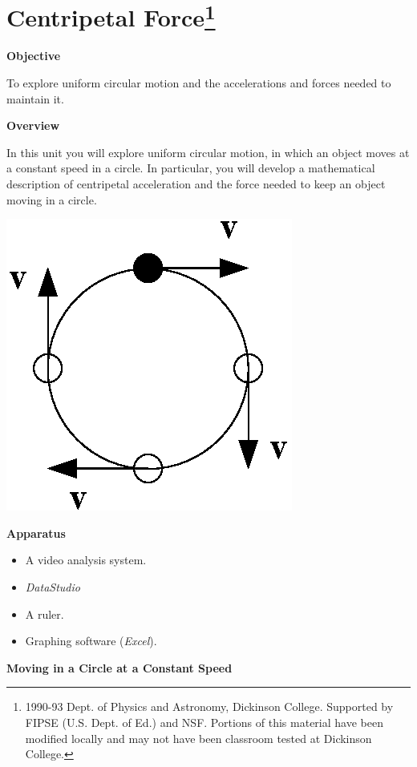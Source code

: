 \section{Centripetal Force\footnote{
1990-93 Dept. of Physics and Astronomy, Dickinson College. Supported by FIPSE
(U.S. Dept. of Ed.) and NSF. Portions of this material have been modified locally
and may not have been classroom tested at Dickinson College.
}}

\makelabheader %

\textbf{Objective} 

To explore uniform circular motion and the accelerations and
forces needed to maintain it.

\textbf{Overview} 

In this unit you will explore uniform circular motion, in which an object moves at a constant
speed in a circle. In particular, you will develop a mathematical description
of centripetal acceleration and the force needed to keep an object moving in
a circle.

\vspace{0.3cm}
{\par\centering \includegraphics{centripetalForceFor132/centripetal_fig1b.eps} \par}
\vspace{0.3cm}

\textbf{Apparatus}

\begin{itemize}
\item A video analysis system. 
\item {\it DataStudio}
\item A ruler. 
\item Graphing software ({\it Excel}). 
\end{itemize}
\textbf{Moving in a Circle at a Constant Speed }

